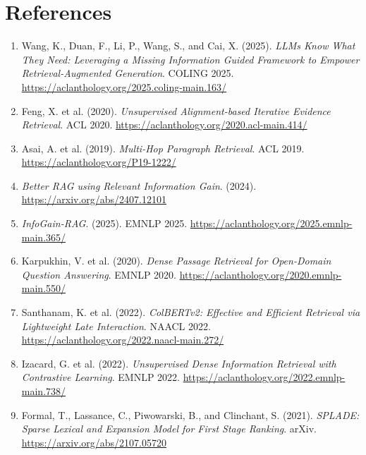 \documentclass[11pt,a4paper]{article}
\begin{document}
\section{References}

\begin{enumerate}[leftmargin=1.6em]

\item Wang, K., Duan, F., Li, P., Wang, S., and Cai, X. (2025).
\textit{LLMs Know What They Need: Leveraging a Missing Information Guided Framework to Empower Retrieval-Augmented Generation}.
COLING 2025.
\url{https://aclanthology.org/2025.coling-main.163/}

\item Feng, X. et al. (2020).
\textit{Unsupervised Alignment-based Iterative Evidence Retrieval}.
ACL 2020.
\url{https://aclanthology.org/2020.acl-main.414/}

\item Asai, A. et al. (2019).
\textit{Multi-Hop Paragraph Retrieval}.
ACL 2019.
\url{https://aclanthology.org/P19-1222/}

\item \textit{Better RAG using Relevant Information Gain}. (2024).
\url{https://arxiv.org/abs/2407.12101}

\item \textit{InfoGain-RAG}. (2025).
EMNLP 2025.
\url{https://aclanthology.org/2025.emnlp-main.365/}

\item Karpukhin, V. et al. (2020).
\textit{Dense Passage Retrieval for Open-Domain Question Answering}.
EMNLP 2020.
\url{https://aclanthology.org/2020.emnlp-main.550/}

\item Santhanam, K. et al. (2022).
\textit{ColBERTv2: Effective and Efficient Retrieval via Lightweight Late Interaction}.
NAACL 2022.
\url{https://aclanthology.org/2022.naacl-main.272/}

\item Izacard, G. et al. (2022).
\textit{Unsupervised Dense Information Retrieval with Contrastive Learning}.
EMNLP 2022.
\url{https://aclanthology.org/2022.emnlp-main.738/}

\item Formal, T., Lassance, C., Piwowarski, B., and Clinchant, S. (2021).
\textit{SPLADE: Sparse Lexical and Expansion Model for First Stage Ranking}.
arXiv.
\url{https://arxiv.org/abs/2107.05720}


\end{enumerate}
\end{document}
